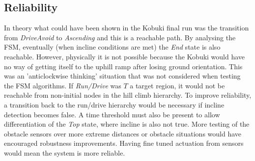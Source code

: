 \subsection{Reliability} %
In theory what could have been shown in the Kobuki final run was the transition from \textit{DriveAvoid} to \textit{Ascending} and this is a reachable path. By analysing the FSM, eventually (when incline conditions are met) the \textit{End} state is also reachable. However, physically it is not possible because the Kobuki would have no way of getting itself to the uphill ramp after losing ground orientation. This was an 'anticlockwise thinking' situation that was not considered when testing the FSM algorithms. If \textit{Run/Drive} was $T$ a target region, it would not be reachable from non-initial nodes in the hill climb hierarchy. To improve reliability, a transition back to the run/drive hierarchy would be necessary if incline detection becomes false. A time threshold must also be present to allow differentiation of the \textit{Top} state, where incline is also not true. More testing of the obstacle sensors over more extreme distances or obstacle situations would have encouraged robustness improvements. Having fine tuned actuation from sensors would mean the system is more reliable.